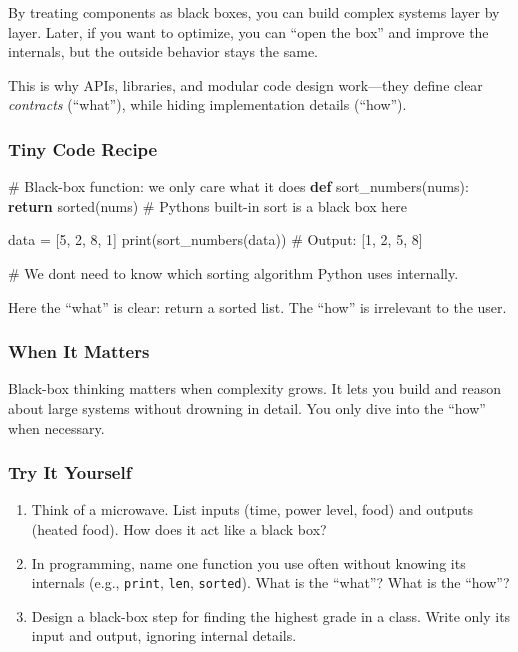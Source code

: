 \documentclass[
  letterpaper,
  DIV=11,
  numbers=noendperiod]{scrreprt}
\newenvironment{Shaded}{\begin{snugshade}}{\end{snugshade}}
\newcommand{\BuiltInTok}[1]{\textcolor[rgb]{0.00,0.23,0.31}{#1}}
\newcommand{\CommentTok}[1]{\textcolor[rgb]{0.37,0.37,0.37}{#1}}
\newcommand{\ControlFlowTok}[1]{\textcolor[rgb]{0.00,0.23,0.31}{\textbf{#1}}}
\newcommand{\DecValTok}[1]{\textcolor[rgb]{0.68,0.00,0.00}{#1}}
\newcommand{\KeywordTok}[1]{\textcolor[rgb]{0.00,0.23,0.31}{\textbf{#1}}}
\newcommand{\NormalTok}[1]{\textcolor[rgb]{0.00,0.23,0.31}{#1}}
\newcommand{\OperatorTok}[1]{\textcolor[rgb]{0.37,0.37,0.37}{#1}}
\providecommand{\tightlist}{%
  \setlength{\itemsep}{0pt}\setlength{\parskip}{0pt}}
\begin{document}
By treating components as black boxes, you can build complex systems
layer by layer. Later, if you want to optimize, you can ``open the box''
and improve the internals, but the outside behavior stays the same.

This is why APIs, libraries, and modular code design work---they define
clear \emph{contracts} (``what''), while hiding implementation details
(``how'').

\subsubsection{Tiny Code Recipe}\label{tiny-code-recipe-39}

\begin{Shaded}
\begin{Highlighting}[]
\CommentTok{\# Black{-}box function: we only care what it does}
\KeywordTok{def}\NormalTok{ sort\_numbers(nums):}
    \ControlFlowTok{return} \BuiltInTok{sorted}\NormalTok{(nums)   }\CommentTok{\# Python\textquotesingle{}s built{-}in sort is a black box here}

\NormalTok{data }\OperatorTok{=}\NormalTok{ [}\DecValTok{5}\NormalTok{, }\DecValTok{2}\NormalTok{, }\DecValTok{8}\NormalTok{, }\DecValTok{1}\NormalTok{]}
\BuiltInTok{print}\NormalTok{(sort\_numbers(data))  }\CommentTok{\# Output: [1, 2, 5, 8]}

\CommentTok{\# We don\textquotesingle{}t need to know which sorting algorithm Python uses internally.}
\end{Highlighting}
\end{Shaded}

Here the ``what'' is clear: return a sorted list. The ``how'' is
irrelevant to the user.

\subsubsection{When It Matters}\label{when-it-matters-39}

Black-box thinking matters when complexity grows. It lets you build and
reason about large systems without drowning in detail. You only dive
into the ``how'' when necessary.

\subsubsection{Try It Yourself}\label{try-it-yourself-41}

\begin{enumerate}
\def\labelenumi{\arabic{enumi}.}
\tightlist
\item
  Think of a microwave. List inputs (time, power level, food) and
  outputs (heated food). How does it act like a black box?
\item
  In programming, name one function you use often without knowing its
  internals (e.g., \texttt{print}, \texttt{len}, \texttt{sorted}). What
  is the ``what''? What is the ``how''?
\item
  Design a black-box step for finding the highest grade in a class.
  Write only its input and output, ignoring internal details.
\end{enumerate}
\end{document}
